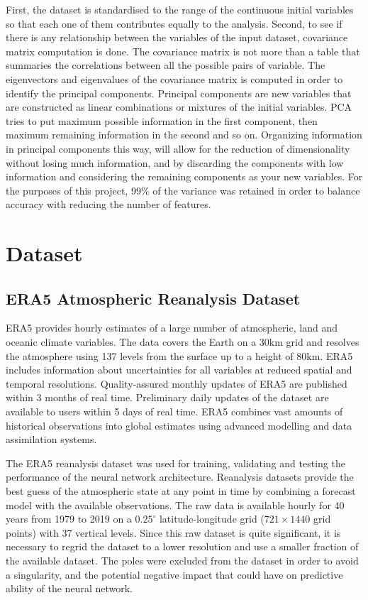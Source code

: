 First, the dataset is standardised to the range of the continuous initial variables so that each one of them contributes equally to the analysis. Second, to see if there is any relationship between the variables of the input dataset, covariance matrix computation is done. The covariance matrix is not more than a table that summaries the correlations between all the possible pairs of variable. The eigenvectors and eigenvalues of the covariance matrix is computed in order to identify the principal components. Principal components are new variables that are constructed as linear combinations or mixtures of the initial variables. PCA tries to put maximum possible information in the first component, then maximum remaining information in the second and so on. Organizing information in principal components this way, will allow for the reduction of dimensionality without losing much information, and  by discarding the components with low information and considering the remaining components as your new variables\cite{pca}. For the purposes of this project, 99\% of the variance was retained in order to balance accuracy with reducing the number of features. 

\section{Dataset}
\subsection{ERA5 Atmospheric Reanalysis Dataset}\label{era5_dataset}
ERA5 provides hourly estimates of a large number of atmospheric, land and oceanic climate variables. The data covers the Earth on a 30km grid and resolves the atmosphere using 137 levels from the surface up to a height of 80km. ERA5 includes information about uncertainties for all variables at reduced spatial and temporal resolutions. Quality-assured monthly updates of ERA5 are published within 3 months of real time. Preliminary daily updates of the dataset are available to users within 5 days of real time. ERA5 combines vast amounts of historical observations into global estimates using advanced modelling and data assimilation systems\cite{era5}.

The ERA5 reanalysis dataset was used for training, validating and testing the performance of the neural network architecture. Reanalysis datasets provide the best guess of the atmospheric state at any point in time by combining a forecast model with the available observations. The raw data is available hourly for 40 years from 1979 to 2019 on a $0.25^{\circ}$ latitude-longitude grid ($721 \times 1440$ grid points) with 37 vertical levels. Since this raw dataset is quite significant, it is necessary to regrid the dataset to a lower resolution and use a smaller fraction of the available dataset\cite{rasp2020weatherbench}.  The poles were excluded from the dataset in order to avoid a singularity, and the potential negative impact that could have on predictive ability of the neural network.

